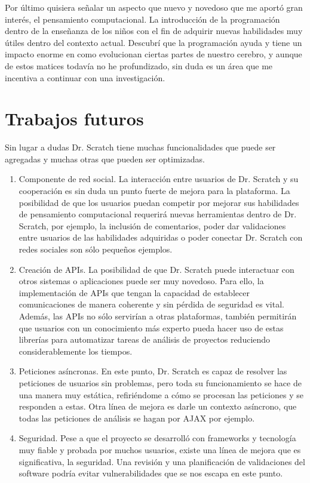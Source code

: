 \documentclass[a4paper, 12pt]{book}
\begin{document}
Por último quisiera señalar un aspecto que nuevo y novedoso que me aportó
gran interés, el pensamiento computacional. La introducción de la 
programación dentro de la enseñanza de los niños con el fin de adquirir
nuevas habilidades muy útiles dentro del contexto actual. Descubrí que 
la programación ayuda y tiene un impacto enorme en como evolucionan 
ciertas partes de nuestro cerebro, y aunque de estos matices todavía
no he profundizado, sin duda es un área que me incentiva a continuar con
una investigación.


\section{Trabajos futuros}
\label{sec:trabajos_futuros}


Sin lugar a dudas Dr. Scratch tiene muchas funcionalidades que puede ser agregadas
y muchas otras que pueden ser optimizadas.


\begin{enumerate}
  \item Componente de red social. La interacción entre usuarios de Dr. Scratch y su
	cooperación es sin duda un punto fuerte de mejora para la plataforma. La posibilidad
	de que los usuarios puedan competir por mejorar sus habilidades de pensamiento
	computacional requerirá nuevas herramientas dentro de Dr. Scratch, por ejemplo, la
	inclusión de comentarios, poder dar validaciones entre usuarios de las habilidades
	adquiridas o poder conectar Dr. Scratch con redes sociales son sólo pequeños ejemplos.
  \item Creación de APIs. La posibilidad de que Dr. Scratch puede interactuar con
	otros sistemas o aplicaciones puede ser muy novedoso. Para ello, la implementación
	de APIs que tengan la capacidad de establecer comunicaciones de manera coherente y
	sin pérdida de seguridad es vital. Además, las APIs no sólo servirían a otras
	plataformas, también permitirán que usuarios con un conocimiento más experto pueda
	hacer uso de estas librerías para automatizar tareas de análisis de proyectos 
	reduciendo considerablemente los tiempos.
	\item Peticiones asíncronas. En este punto, Dr. Scratch es capaz de resolver las
	peticiones de usuarios sin problemas, pero toda su funcionamiento se hace de una
	manera muy estática, refiriéndome a cómo se procesan las peticiones y se responden
	a estas. Otra línea de mejora es darle un contexto asíncrono, que todas las 
	peticiones de análisis se hagan por AJAX por ejemplo.
	\item Seguridad. Pese a que el proyecto se desarrolló con frameworks y tecnología 
	muy fiable y probada por muchos usuarios, existe una línea de mejora que es 
	significativa, la seguridad. Una revisión y una planificación de validaciones del
	software podría evitar vulnerabilidades que se nos escapa en este punto. 
\end{enumerate}
\end{document}
